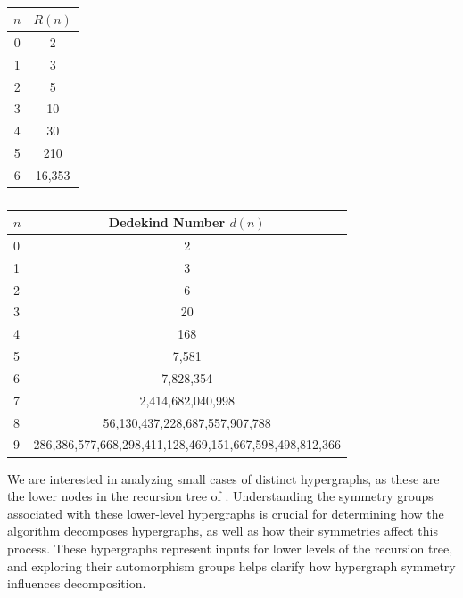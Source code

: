 \begin{table}[h]
\begin{minipage}[b]{0.38\linewidth}\centering
{\Large
\begin{tabular}{|c|c|}
\hline
$n$ & $R(n)$\\\hline
0 & 2\\\hline
1 & 3\\\hline
2 & 5\\\hline
3 & 10\\\hline
4 & 30\\\hline
5 & 210\\\hline
6 & 16,353\\\hline
\end{tabular}}
\caption{Isomorphism classes of Sperner hypergraphs on $n$ vertices. (\texttt{A003182}, \cite{SY14})}
\end{minipage}\hfill
\begin{minipage}[b]{0.58\linewidth}\centering
{\tiny
\begin{tabular}{|l|c|}
\hline
$n$ & Dedekind Number $d(n)$\\\hline
0 & 2\\\hline
1 & 3\\\hline
2 & 6\\\hline
3 & 20\\\hline
4 & 168\\\hline
5 & 7,581\\\hline
6 & 7,828,354\\\hline
7 & 2,414,682,040,998\\\hline
8 & 56,130,437,228,687,557,907,788\\\hline
9 & 286,386,577,668,298,411,128,469,151,667,598,498,812,366\\\hline
\end{tabular}}
\caption[The Dedekind numbers $d(0),\dots,d(9)$.]{ }
\end{minipage}
\end{table}

We are interested in analyzing small cases of distinct hypergraphs, as these are the lower nodes in the recursion tree of \FKA. Understanding the symmetry groups associated with these lower-level hypergraphs is crucial for determining how the \FKA{} algorithm decomposes hypergraphs, as well as how their symmetries affect this process. These hypergraphs represent inputs for lower levels of the recursion tree, and exploring their automorphism groups helps clarify how hypergraph symmetry influences \FKA{} decomposition.

